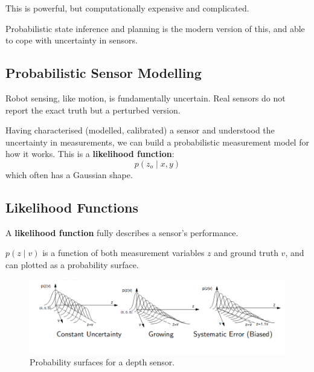 \documentclass[11pt]{article}
\begin{document}
This is powerful, but computationally expensive and complicated.

Probabilistic state inference and planning is the modern version of this, and able to cope with uncertainty in sensors.

\subsection{Probabilistic Sensor Modelling}
Robot sensing, like motion, is fundamentally uncertain.
Real sensors do not report the exact truth but a perturbed version.

Having characterised (modelled, calibrated) a sensor and understood the uncertainty in measurements, we can build a probabilistic measurement model for how it works.
This is a \textbf{likelihood function}:
\[
  p(z_o \mid x, y)
\]
which often has a Gaussian shape.

\subsection{Likelihood Functions}
A \textbf{likelihood function} fully describes a sensor's performance.

$p(z \mid v)$ is a function of both measurement variables $z$ and ground truth $v$, and can plotted as a probability surface.

\begin{figure}[h]
  \caption{Probability surfaces for a depth sensor.}
  \includegraphics[scale=0.4]{uncertainty}
  \centering
\end{figure}
\end{document}

